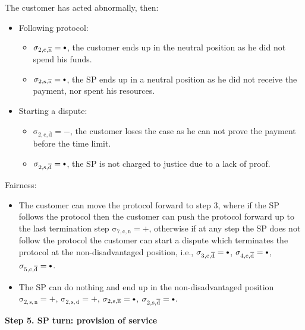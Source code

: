 \documentclass{ieeeaccess}
\newcommand\sbullet[1][.75]{\mathbin{\ThisStyle{\vcenter{\hbox{%
  \scalebox{#1}{$\SavedStyle\bullet$}}}}}%
}
\begin{document}
The customer has acted abnormally, then:

\begin{itemize}
\item
  Following protocol:
  \begin{itemize}
  \item
    \(\operatorname{\sigma_{2, c, \overline{n}} = \sbullet}\), the customer ends up in the neutral position as he did not spend his funds.
  \item
    \(\operatorname{\sigma_{2, s, \overline{n}} = \sbullet}\), the SP ends up in a neutral position as he did not receive the payment, nor spent his resources.
  \end{itemize}
\item
  Starting a dispute:

  \begin{itemize}
  
  \item
    \(\operatorname{\sigma_{2, c, \overline{d}} = -}\), the customer loses the case as he can not prove the payment before the time limit.
  \item
    \(\operatorname{\sigma_{2, s, \overline{d}} = \sbullet}\), the SP is not charged to justice due to a lack of proof.
  \end{itemize}
\end{itemize}

Fairness:

\begin{itemize}

\item
  The customer can move the protocol forward to step 3, where if the SP follows the protocol then the customer can push the protocol forward up to the last termination step \(\operatorname{\sigma_{7, c, n} = +}\), otherwise if at any step the SP does not follow the protocol the customer can start a dispute which terminates the protocol at the non-disadvantaged position, i.e., \(\operatorname{\sigma_{3, c, \overline{d}} = \sbullet}\), \(\operatorname{\sigma_{4, c, \overline{d}} = \sbullet}\), \(\operatorname{\sigma_{5, c, \overline{d}} = \sbullet}\).
\item
  The SP can do nothing and end up in the non-disadvantaged position \(\operatorname{\sigma_{2, s, n} = +}\), \(\operatorname{\sigma_{2, s, d} = +}\), \(\operatorname{\sigma_{2, s, \overline{n}} = \sbullet}\), \(\operatorname{\sigma_{2, s, \overline{d}} = \sbullet}\).
\end{itemize}

\noindent \textbf
{Step 5. SP turn: provision of service}
\end{document}
